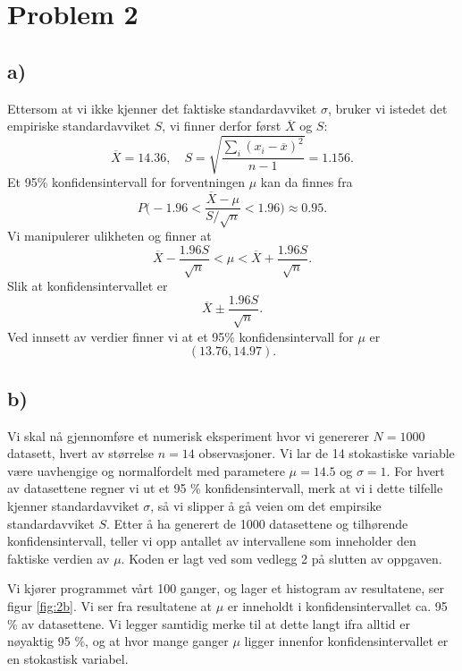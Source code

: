 \documentclass[a4paper, 11pt, titlepage, english]{article}
\begin{document}
\section*{Problem 2}
\subsection*{a)}
Ettersom at vi ikke kjenner det faktiske standardavviket $\sigma$, bruker vi istedet det empiriske standardavviket $S$, vi finner derfor først $\overline{X}$ og $S$:
$$\overline{X} = 14.36, \quad S  = \sqrt{\frac{\sum_i (x_i - \overline{x})^2}{n-1}} = 1.156.$$
Et 95\% konfidensintervall for forventningen $\mu$ kan da finnes fra
$$P\bigg(-1.96 < \frac{\overline{X} - \mu}{S/\sqrt{n}}< 1.96 \bigg) \approx 0.95.$$
Vi manipulerer ulikheten og finner at
$$\overline{X} - \frac{1.96S}{\sqrt{n}} < \mu < \overline{X} + \frac{1.96S}{\sqrt{n}}.$$
Slik at konfidensintervallet er
$$\overline{X} \pm \frac{1.96S}{\sqrt{n}}.$$
Ved innsett av verdier finner vi at et 95\% konfidensintervall for $\mu$ er
$$(13.76, 14.97).$$

\clearpage

\subsection*{b)}
Vi skal nå gjennomføre et numerisk eksperiment hvor vi genererer $N=1000$ datasett, hvert av størrelse $n=14$ observasjoner. Vi lar de 14 stokastiske variable være uavhengige og normalfordelt med parametere $\mu = 14.5$ og $\sigma=1$. For hvert av datasettene regner vi ut et 95 \% konfidensintervall, merk at vi i dette tilfelle kjenner standardavviket $\sigma$, så vi slipper å gå veien om det empirsike standardavviket $S$. Etter å ha generert de 1000 datasettene og tilhørende konfidensintervall, teller vi opp antallet av intervallene som inneholder den faktiske verdien av $\mu$. Koden er lagt ved som vedlegg 2 på slutten av oppgaven.

Vi kjører programmet vårt 100 ganger, og lager et histogram av resultatene, ser figur \ref{fig:2b}. Vi ser fra resultatene at $\mu$ er inneholdt i konfidensintervallet ca. 95 \% av datasettene. Vi legger samtidig merke til at dette langt ifra alltid er nøyaktig 95 \%, og at hvor mange ganger $\mu$ ligger innenfor konfidensintervallet er en stokastisk variabel.
\end{document}
